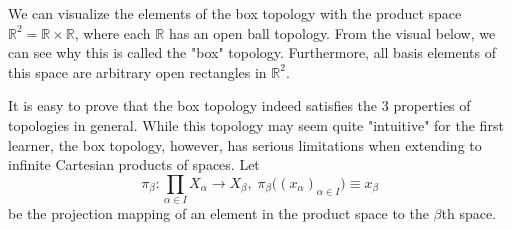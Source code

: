 \documentclass{article}
\begin{document}
    We can visualize the elements of the box topology with the product space $\mathbb{R}^2 = \mathbb{R} \times \mathbb{R}$, where each $\mathbb{R}$ has an open ball topology. From the visual below, we can see why this is called the "box" topology. Furthermore, all basis elements of this space are arbitrary open rectangles in $\mathbb{R}^2$. 
    \begin{center}
    \end{center}

    It is easy to prove that the box topology indeed satisfies the 3 properties of topologies in general. While this topology may seem quite "intuitive" for the first learner, the box topology, however, has serious limitations when extending to infinite Cartesian products of spaces. Let 
    \[\pi_\beta: \prod_{\alpha \in I} X_\alpha \longrightarrow X_\beta, \; \pi_\beta \big( (x_\alpha)_{\alpha \in I}\big) \equiv x_\beta\] 
    be the projection mapping of an element in the product space to the $\beta$th space. 
\end{document}

